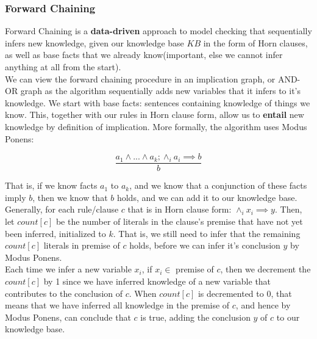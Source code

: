 \documentclass[12pt]{article}
\begin{document}
\subsubsection{Forward Chaining}

Forward Chaining is a \textbf{data-driven} approach to model checking that sequentially infers new knowledge, given our knowledge base $KB$ in the form of Horn clauses, as well as base facts that we already know(important, else we cannot infer anything at all from the start).\\

We can view the forward chaining procedure in an implication graph, or AND-OR graph as the algorithm sequentially adds new variables that it infers to it's knowledge. We start with base facts: sentences containing knowledge of things we know. This, together with our rules in Horn clause form, allow us to \textbf{entail} new knowledge by definition of implication. More formally, the algorithm uses Modus Ponens:

\begin{equation*}
\frac{a_1 \land ... \land a_k; \land_i a_i \implies b}{b}
\end{equation*}

That is, if we know facts $a_1$ to $a_k$, and we know that a conjunction of these facts imply $b$, then we know that $b$ holds, and we can add it to our knowledge base. Generally, for each rule/clause $c$ that is in Horn clause form: $\land_i x_i \implies y$. Then, let $count[c]$ be the number of literals in the clause's premise that have not yet been inferred, initialized to $k$. That is, we still need to infer that the remaining $count[c]$ literals in premise of $c$ holds, before we can infer it's conclusion $y$ by Modus Ponens.\\

Each time we infer a new variable $x_i$, if $x_i \in$ premise of $c$, then we decrement the $count[c]$ by 1 since we have inferred knowledge of a new variable that contributes to the conclusion of $c$. When $count[c]$ is decremented to 0, that means that we have inferred all knowledge in the premise of $c$, and hence by Modus Ponens, can conclude that $c$ is true, adding the conclusion $y$ of $c$ to our knowledge base.
\end{document}
